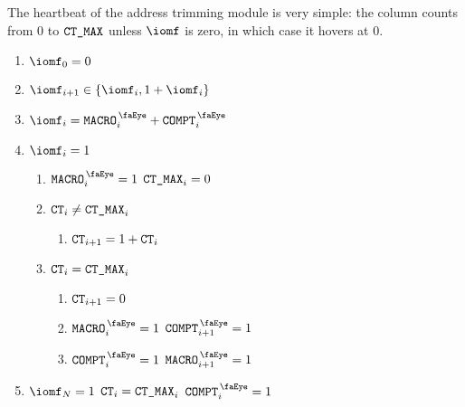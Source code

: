The heartbeat of the address trimming module is very simple: the \ct{} column counts from $0$ to $\texttt{CT\_MAX}$ unless $\iomf$ is zero, in which case it hovers at $0$.
\begin{enumerate}
    \item $\iomf_{0} = 0$
    \item $\iomf_{i + 1} \in \{ \iomf_{i}, 1 + \iomf_{i} \}$
    \item \If $\iomf_{i} = \isRlpUtilsMacro_{i} + \isRlpUtilsCompt_{i}$
    \item \If $\iomf_{i} = 1$ \Then
	\begin{enumerate}
		\item $\isRlpUtilsMacro_{i} =1$ \Then $\texttt{CT\_MAX}_{i} = 0$
	    \item \If $\texttt{CT}_{i} \neq \texttt{CT\_MAX}_{i}$ \Then 
	    \begin{enumerate}
	    	\item $\texttt{CT}_{i + 1} = 1 + \texttt{CT}_{i}$
	    \end{enumerate}
	    \item \If $\texttt{CT}_{i} = \texttt{CT\_MAX}_{i}$ \Then 
	    \begin{enumerate}
	    	\item $\texttt{CT}_{i + 1} = 0$
	    	\item \If $\isRlpUtilsMacro_{i} =1$ \Then $\isRlpUtilsCompt_{i+1} =1$
	    	\item \If $\isRlpUtilsCompt_{i} =1$ \Then $\isRlpUtilsMacro_{i+1} =1$
	    \end{enumerate}
	\end{enumerate}
    \item \If $\iomf_{N} = 1$ \Then $\texttt{CT}_{i} = \texttt{CT\_MAX}_{i}$ \et $\isRlpUtilsCompt_{i} = 1$
\end{enumerate}
